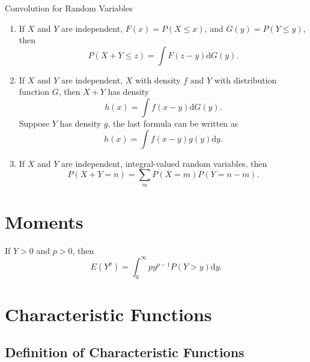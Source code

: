 \begin{theorem}{Convolution for Random Variables}{}
    \begin{enumerate}
        \item If $X$ and $Y$ are independent, $F(x)=P(X\leq x)$, and $G(y)=P(Y\leq y)$, then
              \begin{equation}
                  P(X+Y\leq z)=\int F(z-y)\mathrm{d}G(y).
              \end{equation}
        \item If $X$ and $Y$ are independent,  $X$ with density $f$ and $Y$ with distribution function $G$, then $X+Y$ has density
              \begin{equation}
                  h(x)=\int f(x-y)\mathrm{d}G(y).
              \end{equation}
              Suppose $Y$ has density $g$, the last formula can be written as
              \begin{equation}
                  h(x)=\int f(x-y)g(y)\mathrm{d}y.
              \end{equation}
        \item If $X$ and $Y$ are independent, integral-valued random variables, then
              \begin{equation}
                  P(X+Y=n)=\sum_{m}P(X=m)P(Y=n-m).
              \end{equation}
    \end{enumerate}
\end{theorem}

\section{Moments}

\begin{lemma}{}{}
    If $Y>0$ and $p>0$, then
    \begin{equation}
        E(Y^p)=\int_{0}^{\infty}py^{p-1}P(Y>y)\mathrm{d}y.
    \end{equation}
\end{lemma}

\section{Characteristic Functions}

\subsection{Definition of Characteristic Functions}

